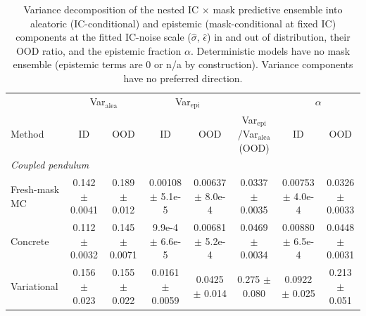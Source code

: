 \begin{table}[t]
\centering
\small
\setlength{\tabcolsep}{3pt}
\caption{Variance decomposition of the nested IC $\times$ mask predictive ensemble into aleatoric (IC-conditional) and epistemic (mask-conditional at fixed IC) components at the fitted IC-noise scale ($\hat\sigma$, $\hat\epsilon$) in and out of distribution, their OOD ratio, and the epistemic fraction $\alpha$. Deterministic models have no mask ensemble (epistemic terms are 0 or n/a by construction). Variance components have no preferred direction.}
\label{tab:decomp}
\begin{tabular}{lccccccc}
\toprule
 & \multicolumn{2}{c}{Var$_\mathrm{alea}$} & \multicolumn{2}{c}{Var$_\mathrm{epi}$} &  & \multicolumn{2}{c}{$\alpha$} \\
\cmidrule(lr){2-3}
\cmidrule(lr){4-5}
\cmidrule(lr){7-8}
Method & ID & OOD & ID & OOD & \makecell{Var$_\mathrm{epi}$/Var$_\mathrm{alea}$\\ (OOD)} & ID & OOD \\
\midrule
\multicolumn{8}{l}{\emph{Coupled pendulum}} \\
Fresh-mask MC & \makecell{0.142\\ {\footnotesize $\pm$ 0.0041}} & \makecell{0.189\\ {\footnotesize $\pm$ 0.012}} & \makecell{0.00108\\ {\footnotesize $\pm$ 5.1e-5}} & \makecell{0.00637\\ {\footnotesize $\pm$ 8.0e-4}} & \makecell{0.0337\\ {\footnotesize $\pm$ 0.0035}} & \makecell{0.00753\\ {\footnotesize $\pm$ 4.0e-4}} & \makecell{0.0326\\ {\footnotesize $\pm$ 0.0033}} \\
Concrete & \makecell{0.112\\ {\footnotesize $\pm$ 0.0032}} & \makecell{0.145\\ {\footnotesize $\pm$ 0.0071}} & \makecell{9.9e-4\\ {\footnotesize $\pm$ 6.6e-5}} & \makecell{0.00681\\ {\footnotesize $\pm$ 5.2e-4}} & \makecell{0.0469\\ {\footnotesize $\pm$ 0.0034}} & \makecell{0.00880\\ {\footnotesize $\pm$ 6.5e-4}} & \makecell{0.0448\\ {\footnotesize $\pm$ 0.0031}} \\
Variational & \makecell{0.156\\ {\footnotesize $\pm$ 0.023}} & \makecell{0.155\\ {\footnotesize $\pm$ 0.022}} & \makecell{0.0161\\ {\footnotesize $\pm$ 0.0059}} & \makecell{0.0425\\ {\footnotesize $\pm$ 0.014}} & \makecell{0.275\\ {\footnotesize $\pm$ 0.080}} & \makecell{0.0922\\ {\footnotesize $\pm$ 0.025}} & \makecell{0.213\\ {\footnotesize $\pm$ 0.051}} \\

\end{tabular}
\end{table}
